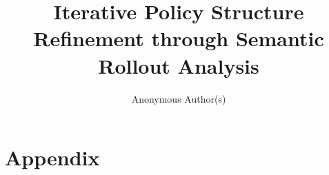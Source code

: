 \documentclass{article}
\title{Iterative Policy Structure Refinement through Semantic Rollout Analysis}
\author{Anonymous Author(s)}
\begin{document}
\maketitle

\begin{abstract}

\end{abstract}







\label{sec:main-end}

\begin{ack}
\end{ack}




% 

\clearpage
\appendix
\section*{Appendix}

\end{document}
